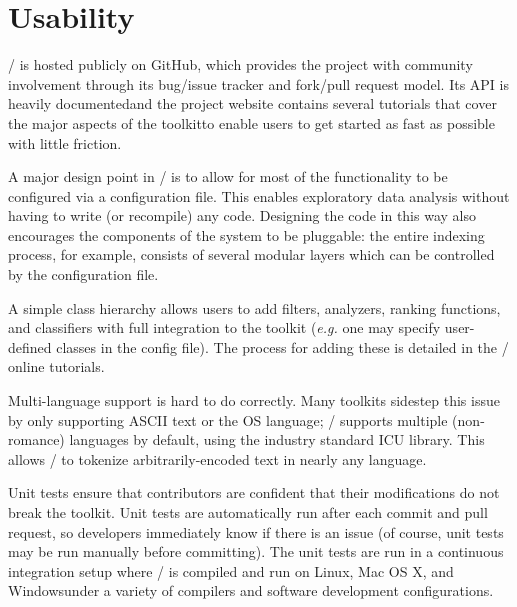 \section{Usability}

\meta/ is hosted publicly on GitHub\footnotemark[1], which provides
the project with community involvement through its bug/issue tracker and
fork/pull request model. Its API is heavily documented\footnotemark[2] and the
project website contains several tutorials that cover the major aspects of
the toolkit\footnotemark[3] to enable users to get started as fast as
possible with little friction.


A major design point in \meta/ is to allow for most of the functionality to be
configured via a configuration file. This enables exploratory data analysis
without having to write (or recompile) any code. Designing the code in this way
also encourages the components of the system to be pluggable: the entire
indexing process, for example, consists of several modular layers which can be
controlled by the configuration file.

A simple class hierarchy allows users to add filters, analyzers, ranking
functions, and classifiers with full integration to the toolkit (\emph{e.g.} one
may specify user-defined classes in the config file). The process for adding
these is detailed in the \meta/ online tutorials.

Multi-language support is hard to do correctly. Many toolkits sidestep this
issue by only supporting ASCII text or the OS language; \meta/ supports multiple
(non-romance) languages by default, using the industry standard ICU
library\footnotemark[4]. This allows \meta/ to tokenize arbitrarily-encoded text
in nearly any language.


Unit tests ensure that contributors are confident that their modifications do
not break the toolkit. Unit tests are automatically run after each commit and
pull request, so developers immediately know if there is an issue (of course,
unit tests may be run manually before committing). The unit tests are run in a
continuous integration setup where \meta/ is compiled and run on
Linux\footnotemark[77], Mac OS X\footnotemark[77], and Windows\footnotemark[78]
under a variety of compilers and software development configurations.

